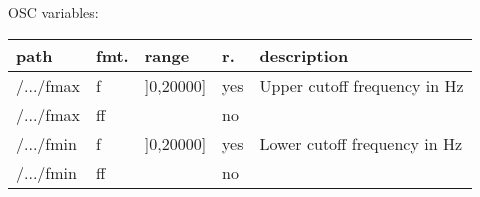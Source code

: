 \begin{snugshade}
{\footnotesize
\label{osctab:tascarapbandpass}
OSC variables:
\nopagebreak

\begin{tabularx}{\textwidth}{llllX}
\hline
path & fmt. & range & r. & description\\
\hline
/.../fmax & f & ]0,20000] & yes & Upper cutoff frequency in Hz\\
/.../fmax & ff &  & no & \\
/.../fmin & f & ]0,20000] & yes & Lower cutoff frequency in Hz\\
/.../fmin & ff &  & no & \\
\hline
\end{tabularx}
}
\end{snugshade}

